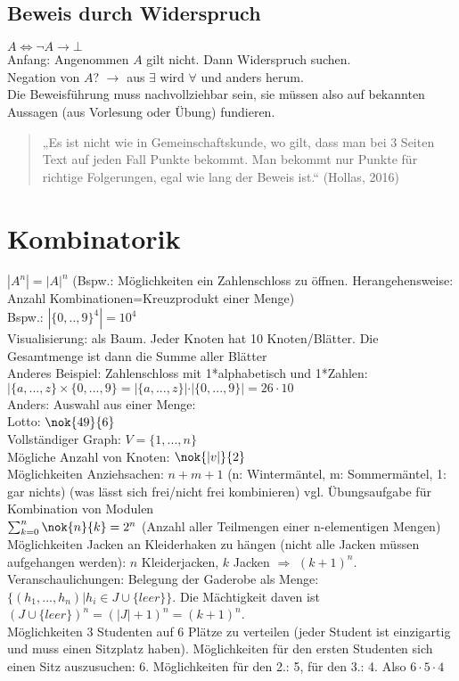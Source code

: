 \subsection{Beweis durch Widerspruch}
$A \Leftrightarrow \neg A \to \bot$\\
Anfang: Angenommen $A$ gilt nicht. Dann Widerspruch suchen.\\
Negation von $A$? $\rightarrow$ aus $\exists$ wird $\forall$ und anders herum. \\
Die Beweisführung muss nachvollziehbar sein, sie müssen also auf bekannten Aussagen (aus Vorlesung oder Übung) fundieren.
\begin{quote}
„Es ist nicht wie in Gemeinschaftskunde, wo gilt, dass man bei 3 Seiten Text auf jeden Fall Punkte bekommt. Man bekommt nur Punkte für richtige Folgerungen, egal wie lang der Beweis ist.“ (Hollas, 2016)
\end{quote}

\section{Kombinatorik}
$|A^n|=|A|^n$ (Bspw.: Möglichkeiten ein Zahlenschloss zu öffnen. Herangehensweise: Anzahl Kombinationen=Kreuzprodukt einer Menge)\\
Bspw.: $|\{0,..,9\}^4|=10^4$\\
Visualisierung: als Baum. Jeder Knoten hat 10 Knoten/Blätter. Die Gesamtmenge ist dann die Summe aller Blätter\\
Anderes Beispiel: Zahlenschloss mit 1*alphabetisch und 1*Zahlen:\\
$|\{a,...,z\}\times \{0,...,9\}= |\{a,...,z\}| \cdot |\{0,...,9\}| =26\cdot 10$ \bigskip\\
Anders: Auswahl aus einer Menge:\\
Lotto: $\nok{49}{6}$\\
Vollständiger Graph: $V=\{1,...,n\}$\\
Mögliche Anzahl von Knoten: $\nok{|v|}{2}$\\
Möglichkeiten Anziehsachen: $n+m+1$ (n: Wintermäntel, m: Sommermäntel, 1: gar nichts) (was lässt sich frei/nicht frei kombinieren) vgl. Übungsaufgabe für Kombination von Modulen\\
$\sum_{k=0}^{n}\nok{n}{k}=2^n$ (Anzahl aller Teilmengen einer n-elementigen Mengen)\medskip\\
Möglichkeiten Jacken an Kleiderhaken zu hängen (nicht alle Jacken müssen aufgehangen werden): $n$ Kleiderjacken, $k$ Jacken $\Rightarrow$ $(k+1)^n$. Veranschaulichungen: Belegung der Gaderobe als Menge: $\{(h_1,...,h_n)|h_i \in J \cup \{leer\}\}$. Die Mächtigkeit daven ist $(J\cup \{leer\})^n=(|J|+1)^n=(k+1)^n$.\\
Möglichkeiten 3 Studenten auf 6 Plätze zu verteilen (jeder Student ist einzigartig und muss einen Sitzplatz haben). Möglichkeiten für den ersten Studenten sich einen Sitz auszusuchen: 6. Möglichkeiten für den 2.: 5, für den 3.: 4. Also $6\cdot 5 \cdot 4$





\printbibliography
